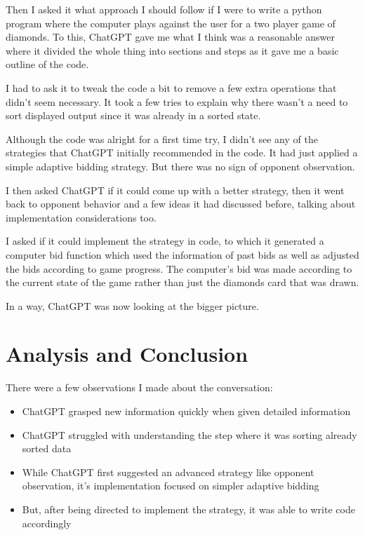 \documentclass{article}
\begin{document}
Then I asked it what approach I should follow if I were to write a python program where the computer plays against the user for a two player game of diamonds. To this, ChatGPT gave me what I think was a reasonable answer where it divided the whole thing into sections and steps as it gave me a basic outline of the code. \newline

I had to ask it to tweak the code a bit to remove a few extra operations that didn't seem necessary. It took a few tries to explain why there wasn't a need to sort displayed output since it was already in a sorted state. \newline

Although the code was alright for a first time try, I didn't see any of the strategies that ChatGPT initially recommended in the code. It had just applied a simple adaptive bidding strategy. But there was no sign of opponent observation. \newline

I then asked ChatGPT if it could come up with a better strategy, then it went back to opponent behavior and a few ideas it had discussed before, talking about implementation considerations too. \newline

I asked if it could implement the strategy in code, to which it generated a computer bid function which used the information of past bids as well as adjusted the bids according to game progress. The computer's bid was made according to the current state of the game rather than just the diamonds card that was drawn. \newline

In a way, ChatGPT was now looking at the bigger picture. \newline

\section{Analysis and Conclusion}
There were a few observations I made about the conversation:

\begin{itemize}
    \item ChatGPT grasped new information quickly when given detailed information
    \item ChatGPT struggled with understanding the step where it was sorting already sorted data
    \item While ChatGPT first suggested an advanced strategy like opponent observation, it's implementation focused on simpler adaptive bidding
    \item But, after being directed to implement the strategy, it was able to write code accordingly
\end{itemize}
\end{document}
